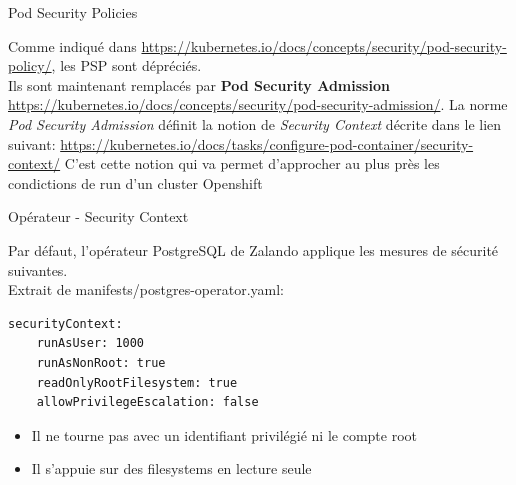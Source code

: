 \begin{frame}[fragile]{Pod Security Policies}

   Comme indiqué dans \url{https://kubernetes.io/docs/concepts/security/pod-security-policy/}, les PSP sont dépréciés.\\
   Ils sont maintenant remplacés par \textbf{Pod Security Admission} \url{https://kubernetes.io/docs/concepts/security/pod-security-admission/}.
   La norme \textit{Pod Security Admission} définit la notion de \textit{Security Context} décrite dans le lien suivant:
   \url{https://kubernetes.io/docs/tasks/configure-pod-container/security-context/}
   C'est cette notion qui va permet d'approcher au plus près les condictions de run d'un cluster Openshift 

\end{frame}


\begin{frame}[fragile]{Opérateur - Security Context}

   Par défaut, l'opérateur PostgreSQL de Zalando applique les mesures de sécurité suivantes.\\
   Extrait de manifests/postgres-operator.yaml:

\begin{tiny}
\begin{Verbatim}[commandchars=\&\#\#]
securityContext:
    runAsUser: 1000
    runAsNonRoot: true
    readOnlyRootFilesystem: true
    allowPrivilegeEscalation: false
\end{Verbatim}
\end{tiny}

\begin{itemize}
   \item Il ne tourne pas avec un identifiant privilégié ni le compte root
   \item Il s'appuie sur des filesystems en lecture seule
\end{itemize}

\end{frame}


